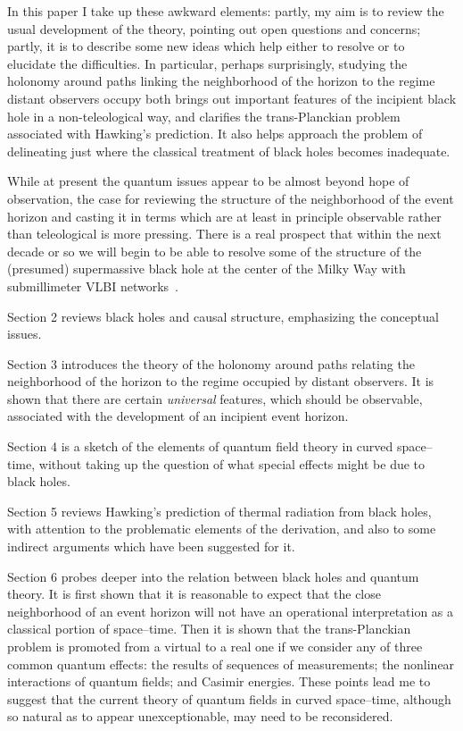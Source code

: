\documentclass[12pt]{article}
\begin{document}
In this paper I take up these awkward elements:  partly, my aim is to review the usual development of the theory, pointing out open questions and concerns; partly, it is to describe some new ideas which help either to resolve or to elucidate the difficulties.  In particular, perhaps surprisingly, studying the holonomy around paths linking the neighborhood of the horizon to the regime distant observers occupy both brings out important features of the incipient black hole in a non-teleological way, and clarifies the trans-Planckian problem associated with Hawking's prediction.  It also helps approach the problem of delineating just where the classical treatment of black holes becomes inadequate.

While at present the quantum issues appear to be almost 
beyond hope of observation, the case for
reviewing the structure of the neighborhood of the event horizon and casting it in terms which are at least in principle observable rather than teleological is more pressing.  There is a real prospect that within the next decade or so we will begin to be able to resolve some of the structure of the (presumed) supermassive black hole at the center of the Milky Way with submillimeter VLBI networks~\citep{Doeleman:2009te}.

Section 2 reviews black holes and causal structure, emphasizing the conceptual issues.

Section 3 introduces the theory of the holonomy around paths relating the neighborhood of the horizon to the regime occupied by distant observers.  It is shown that there are certain {\em universal} features, which should be observable, associated with the development of an incipient event horizon.

Section 4 is a sketch of the elements of quantum field theory in curved space--time, without taking up the question of what special effects might be due to black holes.

Section 5 reviews Hawking's prediction of thermal radiation from black holes, with attention to the problematic elements of the derivation, and also to some indirect arguments which have been suggested for it.

Section 6 probes deeper into the relation between black holes and quantum theory.  It is first shown that it is reasonable to expect that the close neighborhood of an event horizon will not have an operational interpretation as a classical portion of space--time.  Then it is shown that the trans-Planckian problem is promoted from a virtual to a real one if we consider any of three common quantum effects:  the results of sequences of measurements; the nonlinear interactions of quantum fields; and Casimir energies.  These points lead me to suggest that the current theory of quantum fields in curved space--time, although so natural as to appear unexceptionable, may need to be reconsidered.
\end{document}
